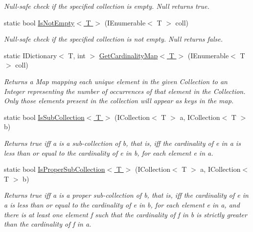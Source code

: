 \begin{DoxyCompactItemize}
\begin{DoxyCompactList}\small\item\em Null-\/safe check if the specified collection is empty. Null returns true. \end{DoxyCompactList}\item 
static bool \hyperlink{class_ultimate_1_1_utilities_1_1_collection_utils_a586a0f696aaf35126f7afe4f98e4eb9f}{Is\+Not\+Empty$<$ T $>$} (I\+Enumerable$<$ T $>$ coll)
\begin{DoxyCompactList}\small\item\em Null-\/safe check if the specified collection is not empty. Null returns false. \end{DoxyCompactList}\item 
static I\+Dictionary$<$ T, int $>$ \hyperlink{class_ultimate_1_1_utilities_1_1_collection_utils_abaae9061c334c8e023fd3ba3d29a1c42}{Get\+Cardinality\+Map$<$ T $>$} (I\+Enumerable$<$ T $>$ coll)
\begin{DoxyCompactList}\small\item\em Returns a Map mapping each unique element in the given Collection to an Integer representing the number of occurrences of that element in the Collection. Only those elements present in the collection will appear as keys in the map. \end{DoxyCompactList}\item 
static bool \hyperlink{class_ultimate_1_1_utilities_1_1_collection_utils_a4c1dd26a8294642e66d3dd80c477d8de}{Is\+Sub\+Collection$<$ T $>$} (I\+Collection$<$ T $>$ a, I\+Collection$<$ T $>$ b)
\begin{DoxyCompactList}\small\item\em Returns true iff a is a sub-\/collection of b, that is, iff the cardinality of e in a is less than or equal to the cardinality of e in b, for each element e in a. \end{DoxyCompactList}\item 
static bool \hyperlink{class_ultimate_1_1_utilities_1_1_collection_utils_a76a94e886c718074eac0bc886de13bfc}{Is\+Proper\+Sub\+Collection$<$ T $>$} (I\+Collection$<$ T $>$ a, I\+Collection$<$ T $>$ b)
\begin{DoxyCompactList}\small\item\em Returns true iff a is a proper sub-\/collection of b, that is, iff the cardinality of e in a is less than or equal to the cardinality of e in b, for each element e in a, and there is at least one element f such that the cardinality of f in b is strictly greater than the cardinality of f in a. \end{DoxyCompactList}\item 

\end{DoxyCompactItemize}
